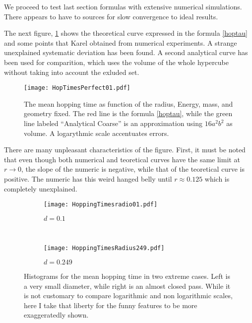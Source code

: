 \documentclass[a4paper,10pt, jcp, aps, preprint]{revtex4-1}
\begin{document}
We proceed to test last section formulas with
extensive numerical simulations. There appears to have to
sources for slow convergence to ideal results.

The next figure, \ref{MeanHopp01} shows the theoretical curve 
expressed in the formula \ref{hoptau} and some points
that Karel obtained from numerical experiments. A strange unexplained
systematic
deviation has been found. A second analytical curve
has been used for comparition, which uses the volume of the
whole hypercube without taking into account the exluded
set. 

\begin{figure}[h]
  \centering
  \texttt{[image: HopTimesPerfect01.pdf]}
  \caption{The mean hopping time as function of the radius, Energy, mass, 
and geometry fixed.
The red line is the formula \ref{hoptau}, while the green line
labeled ``Analytical Coarse'' is an approximation using
 $16a^2b^2$ as volume. A logarythmic scale accentuates errors.}\label{MeanHopp01}
\end{figure}

There are many unpleasant characteristics of the figure. First, it must be
noted that even though both numerical and teoretical curves have the
same limit at $r\rightarrow 0$, the slope of the numeric is negative, while 
that of the teoretical curve is positive. The numeric has this weird 
hanged belly until $r\approx 0.125$ which is completely unexplained.

\begin{figure}[h]
        \centering
        \begin{subfigure}[b]{0.45\textwidth}
                \centering
                \texttt{[image: HoppingTimesradio01.pdf]}
                \caption{$d=0.1$}
                \label{smallradius}
        \end{subfigure}%
        ~ %
        \begin{subfigure}[b]{0.45\textwidth}
                \centering
                \texttt{[image: HoppingTimesRadius249.pdf]}
                \caption{$d=0.249$}
                \label{bigradius}
        \end{subfigure}       
        \caption{Histograms for the mean hopping time
in two extreme cases. Left is a very small diameter, while right is an almost
closed pass. While it is not customary to compare logarithmic and non
logarithmic scales, here I take that liberty for the funny features to be
more exaggeratedly shown.}\label{histohopps}
\end{figure}
\end{document}
